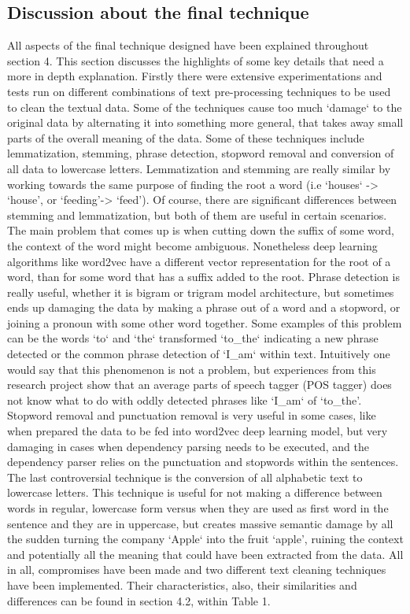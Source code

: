 \documentclass{sig-alternate}
\begin{document}
\subsection{Discussion about the final technique}
All aspects of the final technique designed have been explained throughout section 4. This section discusses the highlights of some key details that need a more in depth explanation.
Firstly there were extensive experimentations and tests run on different combinations of text pre-processing techniques to be used to clean the textual data. Some of the techniques cause too much `damage` to the original data by alternating it into something more general, that takes away small parts of the overall meaning of the data. Some of these techniques include lemmatization, stemming, phrase detection, stopword removal and conversion of all data to lowercase letters. Lemmatization and stemming are really similar by working towards the same purpose of finding the root a word (i.e `houses` -> `house', or `feeding'-> `feed'). Of course, there are significant differences between stemming and lemmatization, but both of them are useful in certain scenarios. The main problem that comes up is when cutting down the suffix of some word, the context of the word might become ambiguous. Nonetheless deep learning algorithms like word2vec have a different vector representation for the root of a word, than for some word that has a suffix added to the root. Phrase detection is really useful, whether it is bigram or trigram model architecture, but sometimes ends up damaging the data by making a phrase out of a word and a stopword, or joining a pronoun with some other word together. Some examples of this problem can be the words `to` and `the` transformed `to\_the` indicating a new phrase detected or the common phrase detection of `I\_am` within text. Intuitively one would say that this phenomenon is not a problem, but experiences from this research project show that an average parts of speech tagger (POS tagger) does not know what to do with oddly detected phrases like `I\_am` of `to\_the'. Stopword removal and punctuation removal is very useful in some cases, like when prepared the data to be fed into word2vec deep learning model, but very damaging in cases when dependency parsing needs to be executed, and the dependency parser relies on the punctuation and stopwords within the sentences. The last controversial technique is the conversion of all alphabetic text to lowercase letters. This technique is useful for not making a difference between words in regular, lowercase form versus when they are used as first word in the sentence and they are in uppercase, but creates massive semantic damage by all the sudden turning the company `Apple` into the fruit `apple', ruining the context and potentially all the meaning that could have been extracted from the data. All in all, compromises have been made and two different text cleaning techniques have been implemented. Their characteristics, also, their similarities and differences can be found in section 4.2, within Table 1.
\end{document}

